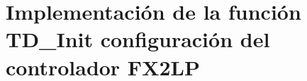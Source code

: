 
\chapter{Implementación de la función TD\_Init configuración del controlador FX2LP}
	\label{ap:fx2lp}
	


%	
	